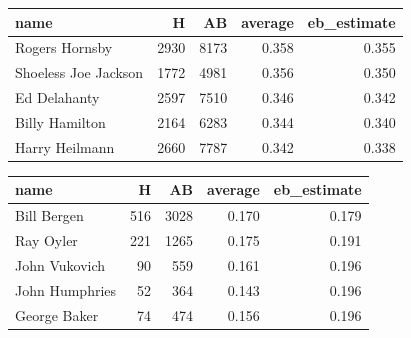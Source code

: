 \documentclass[
]{book}
\newenvironment{Shaded}{\begin{snugshade}}{\end{snugshade}}
\newcommand{\CommentTok}[1]{\textcolor[rgb]{0.56,0.35,0.01}{\textit{#1}}}
\newcommand{\DataTypeTok}[1]{\textcolor[rgb]{0.13,0.29,0.53}{#1}}
\newcommand{\DecValTok}[1]{\textcolor[rgb]{0.00,0.00,0.81}{#1}}
\newcommand{\KeywordTok}[1]{\textcolor[rgb]{0.13,0.29,0.53}{\textbf{#1}}}
\newcommand{\NormalTok}[1]{#1}
\newcommand{\OperatorTok}[1]{\textcolor[rgb]{0.81,0.36,0.00}{\textbf{#1}}}
\newcommand{\StringTok}[1]{\textcolor[rgb]{0.31,0.60,0.02}{#1}}
\begin{document}
\begin{Shaded}
\end{Shaded}

\begin{tabular}{l|r|r|r|r}
\hline
name & H & AB & average & eb\_estimate\\
\hline
Rogers Hornsby & 2930 & 8173 & 0.358 & 0.355\\
\hline
Shoeless Joe Jackson & 1772 & 4981 & 0.356 & 0.350\\
\hline
Ed Delahanty & 2597 & 7510 & 0.346 & 0.342\\
\hline
Billy Hamilton & 2164 & 6283 & 0.344 & 0.340\\
\hline
Harry Heilmann & 2660 & 7787 & 0.342 & 0.338\\
\hline
\end{tabular}

\begin{Shaded}
\end{Shaded}

\begin{tabular}{l|r|r|r|r}
\hline
name & H & AB & average & eb\_estimate\\
\hline
Bill Bergen & 516 & 3028 & 0.170 & 0.179\\
\hline
Ray Oyler & 221 & 1265 & 0.175 & 0.191\\
\hline
John Vukovich & 90 & 559 & 0.161 & 0.196\\
\hline
John Humphries & 52 & 364 & 0.143 & 0.196\\
\hline
George Baker & 74 & 474 & 0.156 & 0.196\\
\hline
\end{tabular}
\end{document}
